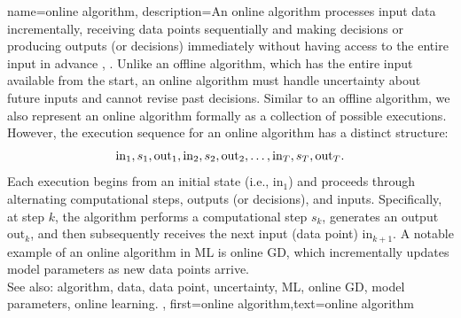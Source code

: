 {name={online algorithm},
	description={An online algorithm processes input data incrementally, 
		receiving data points sequentially and making decisions or producing outputs (or decisions) immediately 
		without having access to the entire input in advance \cite{PredictionLearningGames}, \cite{HazanOCO}. 
		Unlike an offline algorithm, which has the entire input available from the start, an online algorithm 
		must handle uncertainty about future inputs and cannot revise past decisions. Similar to an 
		offline algorithm, we also represent an online algorithm formally as a collection of possible 
		executions. However, the execution sequence for an online algorithm has a distinct structure:
		$${\rm in}_{1},s_1,{\rm out}_{1},{\rm in}_{2},s_2,{\rm out}_{2},\ldots,{\rm in}_{T},s_T,{\rm out}_{T}.$$ 
		Each execution begins from an initial state (i.e., \(\text{in}_{1}\)) and proceeds through alternating 
		computational steps, outputs (or decisions), and inputs. Specifically, at step \(k\), 
		the algorithm performs a computational step \(s_{k}\), generates an output \(\text{out}_{k}\), 
		and then subsequently receives the next input (data point) \(\text{in}_{k+1}\). A 
		notable example of an online algorithm in ML is online GD, which incrementally 
		updates model parameters as new data points arrive. 
					\\ 
		See also: algorithm, data, data point, uncertainty, ML, online GD, model parameters, online learning.
	},
	first={online algorithm},text={online algorithm} 
}





